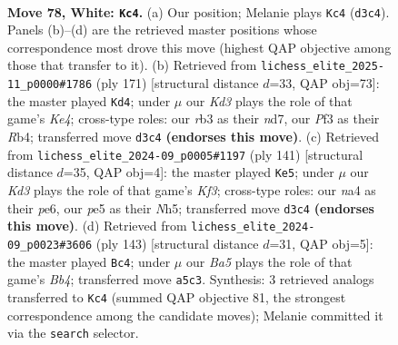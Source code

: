 \documentclass[11pt]{article}
\begin{document}
\clearpage

\begin{figure}[p]\centering
\begin{subfigure}{0.46\textwidth}\centering
\resizebox{\linewidth}{!}{%
\newchessgame
\chessboard[
  setfen={8/8/3p1k1p/B3p1b1/n3P2p/1r1K1P2/7R/8 w - - 4 78},
  showmover=false,
  pgfstyle=straightmove, color=movearrow, markmove={d3-c4}
]}
\caption{}
\end{subfigure}\hfill
\begin{subfigure}{0.46\textwidth}\centering
\resizebox{\linewidth}{!}{%
\newchessgame
\chessboard[
  setfen={8/3N4/8/4k3/1r3pBp/3b1P1P/6P1/6K1 b - - 7 86},
  showmover=false,
  pgfstyle=straightmove, color=movearrow, markmove={e5-d4}
]}
\caption{}
\end{subfigure}
\\[4pt]
\begin{subfigure}{0.46\textwidth}\centering
\resizebox{\linewidth}{!}{%
\newchessgame
\chessboard[
  setfen={8/8/4Pk2/p6n/1bB1p1p1/1P2B3/5P2/5K2 b - - 2 71},
  showmover=false,
  pgfstyle=straightmove, color=movearrow, markmove={f6-e5}
]}
\caption{}
\end{subfigure}\hfill
\begin{subfigure}{0.46\textwidth}\centering
\resizebox{\linewidth}{!}{%
\newchessgame
\chessboard[
  setfen={8/6pk/5p2/1b6/5BP1/3rPPK1/8/4R3 b - - 31 72},
  showmover=false,
  pgfstyle=straightmove, color=movearrow, markmove={b5-c4}
]}
\caption{}
\end{subfigure}
\caption{\textbf{Move 78, White: \texttt{Kc4}.} (a) Our position; Melanie plays \texttt{Kc4} (\texttt{d3c4}). Panels (b)--(d) are the retrieved master positions whose correspondence most drove this move (highest QAP objective among those that transfer to it). (b) Retrieved from \texttt{lichess\_elite\_2025-11\_p0000\#1786} (ply 171) [structural distance $d$=33, QAP obj=73]: the master played \texttt{Kd4}; under $\mu$ our \emph{Kd3} plays the role of that game's \emph{Ke4}; cross-type roles: our \emph{r}b3 as their \emph{n}d7, our \emph{P}f3 as their \emph{R}b4; transferred move \texttt{d3c4} \textbf{(endorses this move)}. (c) Retrieved from \texttt{lichess\_elite\_2024-09\_p0005\#1197} (ply 141) [structural distance $d$=35, QAP obj=4]: the master played \texttt{Ke5}; under $\mu$ our \emph{Kd3} plays the role of that game's \emph{Kf3}; cross-type roles: our \emph{n}a4 as their \emph{p}e6, our \emph{p}e5 as their \emph{N}h5; transferred move \texttt{d3c4} \textbf{(endorses this move)}. (d) Retrieved from \texttt{lichess\_elite\_2024-09\_p0023\#3606} (ply 143) [structural distance $d$=31, QAP obj=5]: the master played \texttt{Bc4}; under $\mu$ our \emph{Ba5} plays the role of that game's \emph{Bb4}; transferred move \texttt{a5c3}. Synthesis: 3 retrieved analogs transferred to \texttt{Kc4} (summed QAP objective 81, the strongest correspondence among the candidate moves); Melanie committed it via the \texttt{search} selector.}
\label{fig:thought-m154}
\end{figure}
\end{document}
